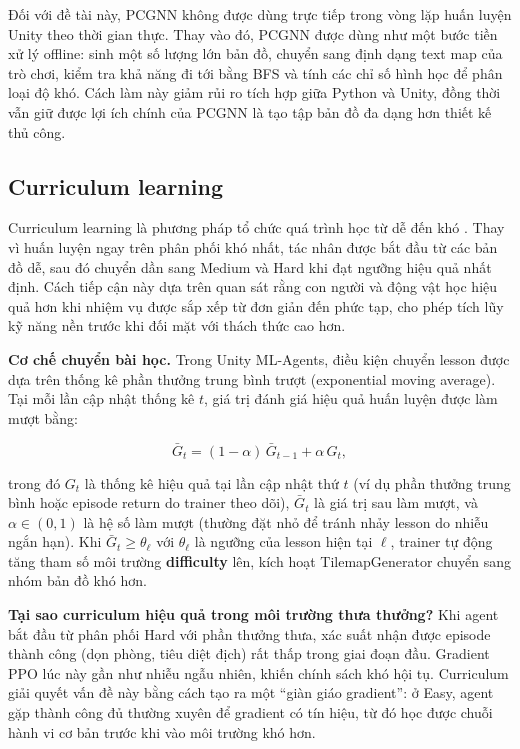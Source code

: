 Đối với đề tài này, PCGNN không được dùng trực tiếp trong vòng lặp huấn luyện Unity theo thời gian thực. Thay vào đó, PCGNN được dùng như một bước tiền xử lý offline: sinh một số lượng lớn bản đồ, chuyển sang định dạng text map của trò chơi, kiểm tra khả năng đi tới bằng BFS và tính các chỉ số hình học để phân loại độ khó. Cách làm này giảm rủi ro tích hợp giữa Python và Unity, đồng thời vẫn giữ được lợi ích chính của PCGNN là tạo tập bản đồ đa dạng hơn thiết kế thủ công.

\subsection{Curriculum learning}

Curriculum learning là phương pháp tổ chức quá trình học từ dễ đến khó \cite{Bengio2009}. Thay vì huấn luyện ngay trên phân phối khó nhất, tác nhân được bắt đầu từ các bản đồ dễ, sau đó chuyển dần sang Medium và Hard khi đạt ngưỡng hiệu quả nhất định. Cách tiếp cận này dựa trên quan sát rằng con người và động vật học hiệu quả hơn khi nhiệm vụ được sắp xếp từ đơn giản đến phức tạp, cho phép tích lũy kỹ năng nền trước khi đối mặt với thách thức cao hơn.

\textbf{Cơ chế chuyển bài học.} Trong Unity ML-Agents, điều kiện chuyển lesson được dựa trên thống kê phần thưởng trung bình trượt (exponential moving average). Tại mỗi lần cập nhật thống kê $t$, giá trị đánh giá hiệu quả huấn luyện được làm mượt bằng:

\begin{equation}
    \bar{G}_t = (1 - \alpha)\,\bar{G}_{t-1} + \alpha\, G_t,
    \label{eq:curriculum_ema}
\end{equation}

trong đó $G_t$ là thống kê hiệu quả tại lần cập nhật thứ $t$ (ví dụ phần thưởng trung bình hoặc episode return do trainer theo dõi), $\bar{G}_t$ là giá trị sau làm mượt, và $\alpha \in (0,1)$ là hệ số làm mượt (thường đặt nhỏ để tránh nhảy lesson do nhiễu ngắn hạn). Khi $\bar{G}_t \geq \theta_\ell$ với $\theta_\ell$ là ngưỡng của lesson hiện tại $\ell$, trainer tự động tăng tham số môi trường \textbf{difficulty} lên, kích hoạt TilemapGenerator chuyển sang nhóm bản đồ khó hơn.

\textbf{Tại sao curriculum hiệu quả trong môi trường thưa thưởng?} Khi agent bắt đầu từ phân phối Hard với phần thưởng thưa, xác suất nhận được episode thành công (dọn phòng, tiêu diệt địch) rất thấp trong giai đoạn đầu. Gradient PPO lúc này gần như nhiễu ngẫu nhiên, khiến chính sách khó hội tụ. Curriculum giải quyết vấn đề này bằng cách tạo ra một ``giàn giáo gradient'': ở Easy, agent gặp thành công đủ thường xuyên để gradient có tín hiệu, từ đó học được chuỗi hành vi cơ bản trước khi vào môi trường khó hơn.

